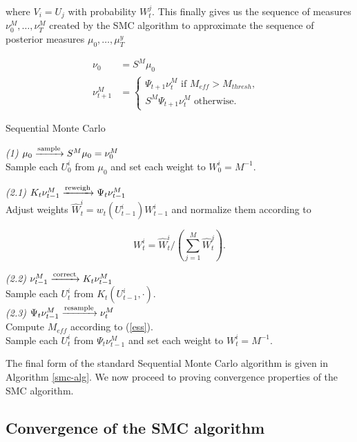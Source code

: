 where $V_i = U_j$ with probability $W^j_t$. This finally gives us the sequence of measures $\nu^M_0, \ldots, \nu^M_T$ created by the SMC algorithm to approximate the sequence of posterior measures $\mu_0, \ldots, \mu^y_T$

\begin{align*}
  \nu_0 &= S^M\mu_0\\
  \nu_{t+1}^M &= \begin{cases}
    \Psi_{t+1}\nu^M_t\text{\ \ \ \ \ \ \ \ if $M_{eff} > M_{thresh},$ }\\
    S^M\Psi_{t+1}\nu^M_t\text{\ \ \ \ otherwise. }
  \end{cases}
\end{align*}


\begin{algorithm}[t!]
  \label{smc-alg}
  \caption{Sequential Monte Carlo}
  \textit{(1) $\mu_0 \xrightarrow{\text{sample}} S^M\mu_0 = \nu^M_0$}\\
  Sample each $U^i_0$ from $\mu_0$ and
  set each weight to $W^i_0 = M^{-1}$. \\
  \;
   {
    \textit{(2.1) $K_t\nu^M_{t-1}\xrightarrow{\text{reweigh}} \Psi_t\nu^M_{t-1}$}\\
    Adjust weights $\hat W^i_t = w_t(U^i_{t-1})W^i_{t-1}$ and normalize them according to

    \begin{equation*}
      W^i_t = \hat W^i_t \Big/ \left(\sum_{j=1}^M\hat W_t^j\right).
    \end{equation*}
    
    \textit{(2.2) $\nu^M_{t-1} \xrightarrow{\text{correct}} K_t\nu^M_{t-1}$ }\\
    Sample each $U^i_t$ from $K_t(U^i_{t-1}, \cdot)$.\\
    \;
    \textit{(2.3) $\Psi_t\nu^M_{t-1} \xrightarrow{\text{resample}} \nu^M_t$}\\
    Compute $M_{eff}$ according to (\ref{ess}).\\
     {
      Sample each $U^i_t$ from $\Psi_t\nu^M_{t-1}$ and set each weight to $W^i_t = M^{-1}$.
    }
  }
\end{algorithm}

The final form of the standard Sequential Monte Carlo algorithm is given in Algorithm \ref{smc-alg}. We now proceed to proving convergence properties of the SMC algorithm.

\subsection{Convergence of the SMC algorithm}

